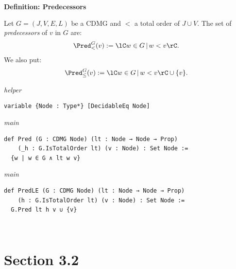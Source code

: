 \vspace{\appendixNotesGap}

\noindent\textbf{Definition: Predecessors}\par\smallskip
{\appendixTexSize
   Let $G=(J,V,E,L)$ be a CDMG and $<$ a total order of $J \cup V$.
   The set of \emph{predecessors} of $v$ in $G$ are:
   \[\Pred^G_<(v) : = \lC w\in G\,|\, w < v \rC.\]
   We also put:
   \[\Pred^G_\le(v) : = \lC w\in G\,|\, w < v \rC \cup \{v\}.\]
\par}
\smallskip
{\small\textit{helper}}
\begin{verbatim}
variable {Node : Type*} [DecidableEq Node]
\end{verbatim}
{\small\textit{main}}
\begin{verbatim}
def Pred (G : CDMG Node) (lt : Node → Node → Prop)
    (_h : G.IsTotalOrder lt) (v : Node) : Set Node :=
  {w | w ∈ G ∧ lt w v}
\end{verbatim}
{\small\textit{main}}
\begin{verbatim}
def PredLE (G : CDMG Node) (lt : Node → Node → Prop)
    (h : G.IsTotalOrder lt) (v : Node) : Set Node :=
  G.Pred lt h v ∪ {v}
\end{verbatim}
~%

\vspace{\appendixNotesGap}

\section*{Section 3.2}


